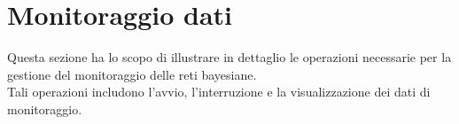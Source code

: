 \section{Monitoraggio dati}\label{Monitoraggio}
Questa sezione ha lo scopo di illustrare in dettaglio le operazioni necessarie per la gestione del monitoraggio delle reti bayesiane.\\
Tali operazioni includono l'avvio, l'interruzione e la visualizzazione dei dati di monitoraggio.



\pagebreak





\pagebreak



\pagebreak



\pagebreak


